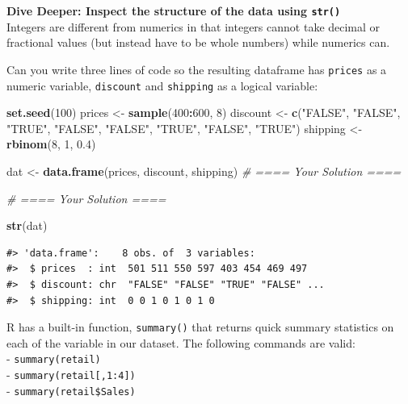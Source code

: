 \documentclass[]{article}
\newenvironment{Shaded}{\begin{snugshade}}{\end{snugshade}}
\newcommand{\CommentTok}[1]{\textcolor[rgb]{0.56,0.35,0.01}{\textit{#1}}}
\newcommand{\DecValTok}[1]{\textcolor[rgb]{0.00,0.00,0.81}{#1}}
\newcommand{\FloatTok}[1]{\textcolor[rgb]{0.00,0.00,0.81}{#1}}
\newcommand{\KeywordTok}[1]{\textcolor[rgb]{0.13,0.29,0.53}{\textbf{#1}}}
\newcommand{\NormalTok}[1]{#1}
\newcommand{\OperatorTok}[1]{\textcolor[rgb]{0.81,0.36,0.00}{\textbf{#1}}}
\newcommand{\StringTok}[1]{\textcolor[rgb]{0.31,0.60,0.02}{#1}}
\begin{document}
\textbf{Dive Deeper: Inspect the structure of the data using
\texttt{str()}}\\
Integers are different from numerics in that integers cannot take
decimal or fractional values (but instead have to be whole numbers)
while numerics can.

Can you write three lines of code so the resulting dataframe has
\texttt{prices} as a numeric variable, \texttt{discount} and
\texttt{shipping} as a logical variable:

\begin{Shaded}
\begin{Highlighting}[]
\KeywordTok{set.seed}\NormalTok{(}\DecValTok{100}\NormalTok{)}
\NormalTok{prices <-}\StringTok{ }\KeywordTok{sample}\NormalTok{(}\DecValTok{400}\OperatorTok{:}\DecValTok{600}\NormalTok{, }\DecValTok{8}\NormalTok{)}
\NormalTok{discount <-}\StringTok{ }\KeywordTok{c}\NormalTok{(}\StringTok{"FALSE"}\NormalTok{, }\StringTok{"FALSE"}\NormalTok{, }\StringTok{"TRUE"}\NormalTok{, }\StringTok{"FALSE"}\NormalTok{, }\StringTok{"FALSE"}\NormalTok{, }\StringTok{"TRUE"}\NormalTok{, }\StringTok{"FALSE"}\NormalTok{, }\StringTok{"TRUE"}\NormalTok{)}
\NormalTok{shipping <-}\StringTok{ }\KeywordTok{rbinom}\NormalTok{(}\DecValTok{8}\NormalTok{, }\DecValTok{1}\NormalTok{, }\FloatTok{0.4}\NormalTok{)}

\NormalTok{dat <-}\StringTok{ }\KeywordTok{data.frame}\NormalTok{(prices, discount, shipping)}
\CommentTok{# ==== Your Solution ====}



\CommentTok{# ==== Your Solution ====}

\KeywordTok{str}\NormalTok{(dat)}
\end{Highlighting}
\end{Shaded}

\begin{verbatim}
#> 'data.frame':    8 obs. of  3 variables:
#>  $ prices  : int  501 511 550 597 403 454 469 497
#>  $ discount: chr  "FALSE" "FALSE" "TRUE" "FALSE" ...
#>  $ shipping: int  0 0 1 0 1 0 1 0
\end{verbatim}

R has a built-in function, \texttt{summary()} that returns quick summary
statistics on each of the variable in our dataset. The following
commands are valid:\\
- \texttt{summary(retail)}\\
- \texttt{summary(retail{[},1:4{]})}\\
- \texttt{summary(retail\$Sales)}
\end{document}

